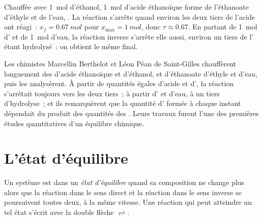 \begin{example}\label{ex:g12:equilibrium:berthelot}
Chauffée avec \qty{1}{mol} d'éthanol, \qty{1}{mol} d'acide éthanoïque
forme de l'éthanoate d'éthyle et de l'eau,
. La réaction s'arrête quand
environ les deux tiers de l'acide ont réagi~: $x_f = \qty{0.67}{mol}$
pour
$x_{\max} = \qty{1}{mol}$, donc $\tau \approx 0.67$. En partant de
\qty{1}{mol} d' et de \qty{1}{mol} d'eau, la réaction inverse
s'arrête elle aussi, environ un tiers de l' étant hydrolysé~: on
obtient le même  final.
\end{example}

\begin{history}
Les chimistes Marcellin Berthelot et Léon Péan de Saint-Gilles
chauffèrent longuement des  d'acide éthanoïque et d'éthanol, et
d'éthanoate d'éthyle et d'eau, puis les analysèrent. À partir de
quantités égales d'acide et d', la réaction s'arrêtait toujours
vers les deux tiers~; à partir d' et d'eau, à un tiers
d'hydrolyse~; et ils remarquèrent que la quantité d' formée à
chaque instant dépendait du produit des quantités des . Leurs
travaux furent l'une des premières études quantitatives d'un équilibre
chimique.
\end{history}

\section{L'état d'équilibre}

\begin{definition}\label{def:g12:equilibrium:equilibrium-state}
Un système est dans un \emph{état d'équilibre}
quand sa composition ne change plus alors que la réaction dans le sens
direct et la réaction dans le sens inverse se poursuivent toutes deux, à
la même vitesse. Une réaction qui peut atteindre un tel état s'écrit
avec la double flèche $\rightleftharpoons$.
\end{definition}

